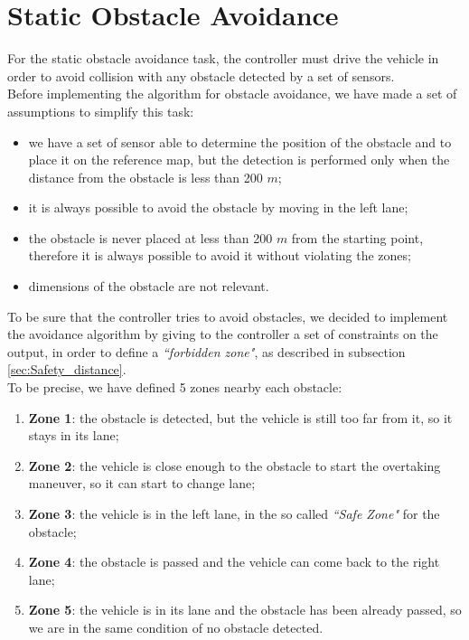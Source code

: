\section{Static Obstacle Avoidance}
\label{chap:StaticObstacleAvoidance}
For the static obstacle avoidance task, the controller must drive the vehicle in order to avoid collision with any obstacle detected by a set of sensors.\\
Before implementing the algorithm for obstacle avoidance, we have made a set of assumptions to simplify this task:
\begin{itemize}
    \item we have a set of sensor able to determine the position of the obstacle and to place it on the reference map, but the detection is performed only when the distance from the obstacle is less than 200 $m$;
    \item it is always possible to avoid the obstacle by moving in the left lane;
    \item the obstacle is never placed at less than 200 $m$ from the starting point, therefore it is always possible to avoid it without violating the zones; 
    \item dimensions of the obstacle are not relevant.
\end{itemize}
To be sure that the controller tries to avoid obstacles, we decided to implement the avoidance algorithm by giving to the controller a set of constraints on the output, in order to define a \textit{``forbidden zone"}, as described in subsection \ref{sec:Safety_distance}.\\
To be precise, we have defined 5 zones nearby each obstacle:
\begin{enumerate}
    \item \textbf{Zone 1}: the obstacle is detected, but the vehicle is still too far from it, so it stays in its lane;
    \item \textbf{Zone 2}: the vehicle is close enough to the obstacle to start the overtaking maneuver, so it can start to change lane;
    \item \textbf{Zone 3}: the vehicle is in the left lane, in the so called \textit{``Safe Zone"} for the obstacle;
    \item \textbf{Zone 4}: the obstacle is passed and the vehicle can come back to the right lane;
    \item \textbf{Zone 5}: the vehicle is in its lane and the obstacle has been already passed, so we are in the same condition of no obstacle detected.
\end{enumerate}

